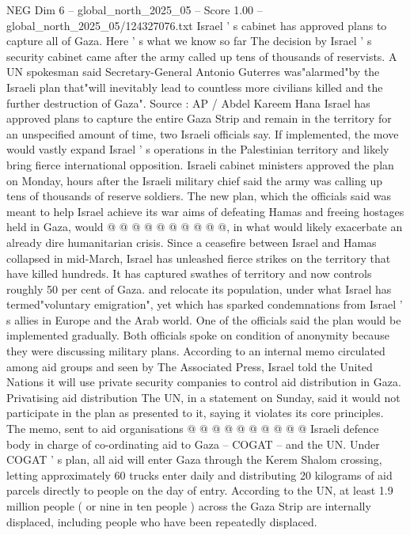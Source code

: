 \begin{textsample}{NEG Dim 6 – global\_north\_2025\_05 – Score 1.00 – global\_north\_2025\_05/124327076.txt}  \label{ex:f6_neg_379}
Israel ' s cabinet has approved plans to capture all of Gaza.
Here ' s what we know so far The decision by Israel ' s security cabinet came after the army called up tens of thousands of reservists.
A UN spokesman said Secretary-General Antonio Guterres was"alarmed"by the Israeli plan that"will inevitably lead to countless more civilians killed and the further destruction of Gaza".
Source : AP / Abdel Kareem Hana Israel has approved plans to capture the entire Gaza Strip and remain in the territory for an unspecified amount of time, two Israeli officials say.
If implemented, the move would vastly expand Israel ' s operations in the Palestinian territory and likely bring fierce international opposition.
Israeli cabinet ministers approved the plan on Monday, hours after the Israeli military chief said the army was calling up tens of thousands of reserve soldiers.
The new plan, which the officials said was meant to help Israel achieve its war aims of defeating Hamas and freeing hostages held in Gaza, would @ @ @ @ @ @ @ @ @ @, in what would likely exacerbate an already dire humanitarian crisis.
Since a ceasefire between Israel and Hamas collapsed in mid-March, Israel has unleashed fierce strikes on the territory that have killed hundreds.
It has captured swathes of territory and now controls roughly 50 per cent of Gaza. and relocate its population, under what Israel has termed"voluntary emigration", yet which has sparked condemnations from Israel ' s allies in Europe and the Arab world.
One of the officials said the plan would be implemented gradually.
Both officials spoke on condition of anonymity because they were discussing military plans.
According to an internal memo circulated among aid groups and seen by The Associated Press, Israel told the United Nations it will use private security companies to control aid distribution in Gaza.
Privatising aid distribution The UN, in a statement on Sunday, said it would not participate in the plan as presented to it, saying it violates its core principles.
The memo, sent to aid organisations @ @ @ @ @ @ @ @ @ @ Israeli defence body in charge of co-ordinating aid to Gaza -- COGAT -- and the UN.
Under COGAT ' s plan, all aid will enter Gaza through the Kerem Shalom crossing, letting approximately 60 trucks enter daily and distributing 20 kilograms of aid parcels directly to people on the day of entry.
According to the UN, at least 1.9 million people ( or nine in ten people ) across the Gaza Strip are internally displaced, including people who have been repeatedly displaced.

\end{textsample}
